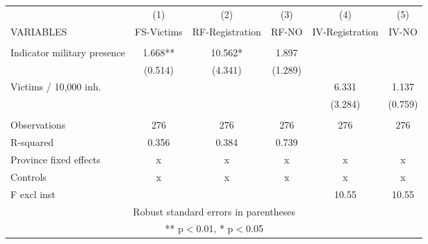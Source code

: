 \begin{tabular}{lccccc} \hline
 & (1) & (2) & (3) & (4) & (5) \\
VARIABLES & FS-Victims & RF-Registration & RF-NO & IV-Registration & IV-NO \\ \hline
 &  &  &  &  &  \\
Indicator military presence & 1.668** & 10.562* & 1.897 &  &  \\
 & (0.514) & (4.341) & (1.289) &  &  \\
Victims / 10,000 inh. &  &  &  & 6.331 & 1.137 \\
 &  &  &  & (3.284) & (0.759) \\
 &  &  &  &  &  \\
Observations & 276 & 276 & 276 & 276 & 276 \\
R-squared & 0.356 & 0.384 & 0.739 &  &  \\
Province fixed effects & x & x & x & x & x \\
Controls & x & x & x & x & x \\
 F excl inst &  &  &  & 10.55 & 10.55 \\ \hline
\multicolumn{6}{c}{ Robust standard errors in parentheses} \\
\multicolumn{6}{c}{ ** p$<$0.01, * p$<$0.05} \\
\end{tabular}
